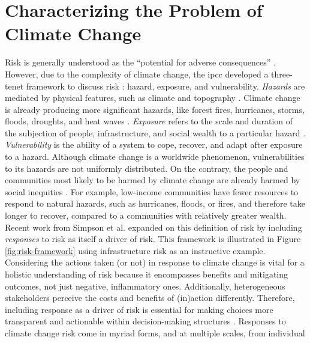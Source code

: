 \section{Characterizing the Problem of Climate Change}
\label{section:climate-change-risk}

Risk is generally understood as the ``potential for adverse consequences''
\cite{reisinger_concept_2020}. However, due to the complexity of climate change,
the \ac{ipcc} developed a three-tenet framework to discuss risk
\cite{reisinger_concept_2020}: hazard, exposure, and vulnerability.
\textit{Hazards} are mediated by physical features, such as climate and
topography \cite{dorkenoo_critical_2022, simpson_framework_2021}.  Climate
change is already producing more significant hazards, like forest fires,
hurricanes, storms, floods, droughts, and heat waves
\cite{reidmiller_fourth_2018,
intergovernmental_panel_on_climate_change_climate_2021, dahl_killer_2019}.
\textit{Exposure} refers to the scale and duration of the subjection of people,
infrastructure, and social wealth to a particular hazard
\cite{simpson_framework_2021,reisinger_concept_2020,li_understanding_2021}.
\textit{Vulnerability} is the ability of a system to cope, recover, and adapt
after exposure to a hazard. Although climate change is a worldwide phenomenon,
vulnerabilities to its hazards are not uniformly distributed. On the contrary,
the people and communities most likely to be harmed by climate change are
already harmed by social inequities \cite{islam_climate_2017}. For example, 
low-income communities have fewer resources to respond to natural hazards,
such as hurricanes, floods, or fires, and therefore take longer to recover, compared
to a communities with relatively greater wealth. Recent work from
Simpson et al. \cite{simpson_framework_2021} expanded on this definition of risk
by including \textit{responses} to risk as itself a driver of risk. This
framework is illustrated in Figure \ref{fig:risk-framework} using infrastructure
risk as an instructive example. Considering the actions taken (or not) in
response to climate change is vital for a holistic understanding of risk because
it encompasses benefits and mitigating outcomes, not just negative, inflammatory
ones. Additionally, heterogeneous stakeholders perceive the costs and benefits
of (in)action differently. Therefore, including response as a driver of risk is
essential for making choices more transparent and actionable within
decision-making structures \cite{simpson_framework_2021}. Responses to climate
change risk come in myriad forms,  and at multiple scales, from individual
